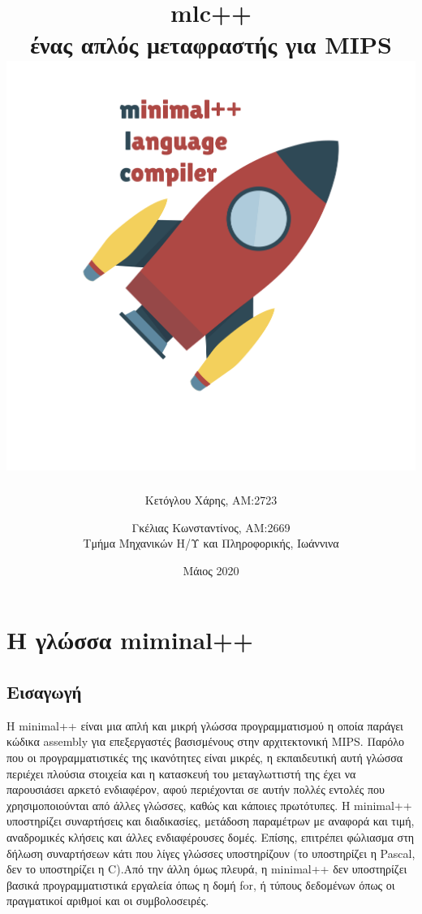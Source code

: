 \documentclass[12pt,a4paper,a4paper]{report}
\begin{document}
\title{mlc++\\ ένας απλός μεταφραστής για MIPS \\ \includegraphics[scale=0.3]{logo}}
\author{Κετόγλου Χάρης, ΑΜ:2723 \and Γκέλιας Κωνσταντίνος, ΑΜ:2669 \\{Τμήμα Μηχανικών Η/Υ και Πληροφορικής, Ιωάννινα}}
\date{Μάιος 2020}
\maketitle

\tableofcontents

\chapter{Η γλώσσα miminal++}

\section{Εισαγωγή}
Η minimal++ είναι μια απλή και μικρή γλώσσα προγραμματισμού η οποία παράγει κώδικα assembly για επεξεργαστές βασισμένους στην αρχιτεκτονική MIPS. Παρόλο που οι προγραμματιστικές της ικανότητες είναι μικρές, η εκπαιδευτική αυτή γλώσσα περιέχει πλούσια στοιχεία και η κατασκευή του μεταγλωττιστή της έχει να παρουσιάσει αρκετό ενδιαφέρον, αφού περιέχονται σε αυτήν πολλές εντολές που χρησιμοποιούνται από άλλες γλώσσες, καθώς και κάποιες πρωτότυπες. Η minimal++ υποστηρίζει συναρτήσεις και διαδικασίες, μετάδοση   παραμέτρων με αναφορά και τιμή, αναδρομικές κλήσεις και άλλες ενδιαφέρουσες δομές. Επίσης, επιτρέπει φώλιασμα στη δήλωση συναρτήσεων κάτι που λίγες γλώσσες υποστηρίζουν (το υποστηρίζει η Pascal, δεν το υποστηρίζει η C).Από την άλλη όμως πλευρά, η minimal++ δεν υποστηρίζει βασικά προγραμματιστικά εργαλεία όπως η δομή for, ή τύπους δεδομένων όπως οι πραγματικοί αριθμοί και οι συμβολοσειρές.
\end{document}
